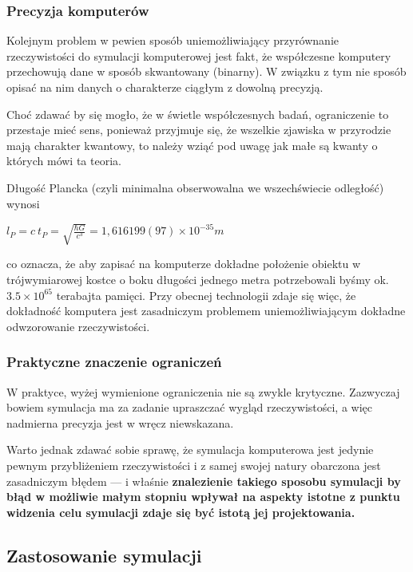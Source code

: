 \subsubsection{Precyzja komputerów}
\par{
Kolejnym problem w pewien sposób uniemożliwiający przyrównanie rzeczywistości do symulacji komputerowej jest fakt, że współczesne komputery przechowują dane w sposób skwantowany (binarny). W związku z tym nie sposób opisać na nim danych o charakterze ciągłym z dowolną precyzją.
}
\par{
Choć zdawać by się mogło, że w świetle współczesnych badań, ograniczenie to przestaje mieć sens, ponieważ przyjmuje się, że wszelkie zjawiska w przyrodzie mają charakter kwantowy, to należy wziąć pod uwagę jak małe są kwanty o których mówi ta teoria.
}
\par{
Długość Plancka (czyli minimalna obserwowalna we wszechświecie odległość) wynosi 
\begin{center}
$l_P = c \ t_P = \sqrt{\frac{\hbar G}{c^3}} = 1,616 199(97) \times 10^{-35} m$
\end{center}
co oznacza, że aby zapisać na komputerze dokładne położenie obiektu w trójwymiarowej kostce o boku długości jednego metra potrzebowali byśmy ok. $3.5 \times 10^{65}$ terabajta pamięci. Przy obecnej technologii zdaje się więc, że dokładność komputera jest zasadniczym problemem uniemożliwiającym dokładne odwzorowanie rzeczywistości.
}

\subsubsection{Praktyczne znaczenie ograniczeń}
\par{
W praktyce, wyżej wymienione ograniczenia nie są zwykle krytyczne. Zazwyczaj bowiem symulacja ma za zadanie upraszczać wygląd rzeczywistości, a więc nadmierna precyzja jest w wręcz niewskazana.
}
\par{
Warto jednak zdawać sobie sprawę, że symulacja komputerowa jest jedynie pewnym przybliżeniem rzeczywistości i z samej swojej natury obarczona jest zasadniczym błędem --- i właśnie \textbf{znalezienie takiego sposobu symulacji by błąd w możliwie małym stopniu wpływał na aspekty istotne z punktu widzenia celu symulacji zdaje się być istotą jej projektowania.}
}

\subsection{Zastosowanie symulacji}

